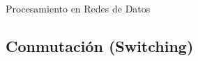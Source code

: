 \documentclass[xcolor=dvipsnames]{beamer}
\begin{document}
\begin{frame}{Procesamiento en Redes de Datos}
  


\end{frame}
 
 
\subsection{Conmutación (Switching)}
\end{document}
